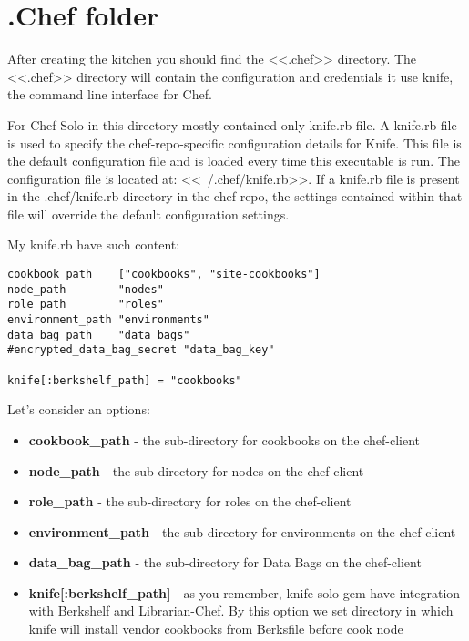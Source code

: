 \section{.Chef folder}\label{sec:solo-chef-folder}

After creating the kitchen you should find the <<.chef>> directory. The <<.chef>> directory will contain the configuration and credentials it use knife, the command line interface for Chef.

For Chef Solo in this directory mostly contained only knife.rb file. A knife.rb file is used to specify the chef-repo-specific configuration details for Knife. This file is the default configuration file and is loaded every time this executable is run. The configuration file is located at: <<~/.chef/knife.rb>>. If a knife.rb file is present in the .chef/knife.rb directory in the chef-repo, the settings contained within that file will override the default configuration settings.

My knife.rb have such content:

\begin{lstlisting}[label=lst:my-cloud-chef-filder1,title=my-cloud/.chef/knife.rb]
cookbook_path    ["cookbooks", "site-cookbooks"]
node_path        "nodes"
role_path        "roles"
environment_path "environments"
data_bag_path    "data_bags"
#encrypted_data_bag_secret "data_bag_key"

knife[:berkshelf_path] = "cookbooks"
\end{lstlisting}

Let's consider an options:

\begin{itemize}
  \item \textbf{cookbook\_path} - the sub-directory for cookbooks on the chef-client
  \item \textbf{node\_path} - the sub-directory for nodes on the chef-client
  \item \textbf{role\_path} - the sub-directory for roles on the chef-client
  \item \textbf{environment\_path} - the sub-directory for environments on the chef-client
  \item \textbf{data\_bag\_path} - the sub-directory for Data Bags on the chef-client
  \item \textbf{knife[:berkshelf\_path]} - as you remember, knife-solo gem have integration with Berkshelf and Librarian-Chef. By this option we set directory in which knife will install vendor cookbooks from Berksfile before cook node
\end{itemize}
